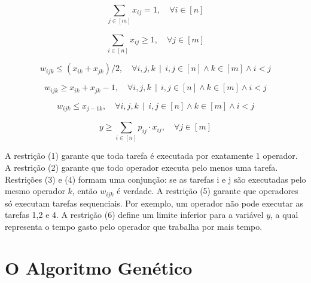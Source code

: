 \documentclass{article}
\begin{document}
\begin{equation}
 	\sum_{j \in [m] }^{} x_{ij} = 1,   \quad \forall i \in [n] 
\end{equation}

\begin{equation}
 	\sum_{i \in [n] }^{} x_{ij}  \geq 1,  \quad  \forall j \in [m] 
\end{equation}

\begin{equation}
 	w_{ijk} \leq (x_{ik} + x_{jk})/2, \quad \forall i,j,k \, \mid \, i,j \in [n]  \land k \in [m] \land i < j
\end{equation}

\begin{equation}
 	w_{ijk} \geq x_{ik} + x_{jk} - 1,  \quad \forall i,j,k \, \mid \, i,j \in [n]  \land k \in [m] \land i < j
\end{equation}

\begin{equation}
 	w_{ijk} \leq x_{j-1k},  \quad \forall i,j,k \, \mid \, i,j \in [n]  \land k \in [m] \land i < j
\end{equation}

\begin{equation}
 	y \geq \sum_{i \in [n] }^{} p_{ij} \cdot x_{ij},   \quad \forall j \in [m]
\end{equation}

A restrição (1) garante que toda tarefa é executada por exatamente 1 operador. A restrição (2) garante que todo operador executa pelo menos uma tarefa. Restrições (3) e (4) formam uma conjunção: se as tarefas i e j são executadas pelo mesmo operador $k$, então $w_{ijk}$ é verdade. A restrição (5) garante que operadores só executam tarefas sequenciais. Por exemplo, um operador não pode executar as tarefas 1,2 e 4. A restrição (6) define um limite inferior para a variável $y$, a qual representa o tempo gasto pelo operador que trabalha por mais tempo.

\section{O Algoritmo Genético}
\end{document}
